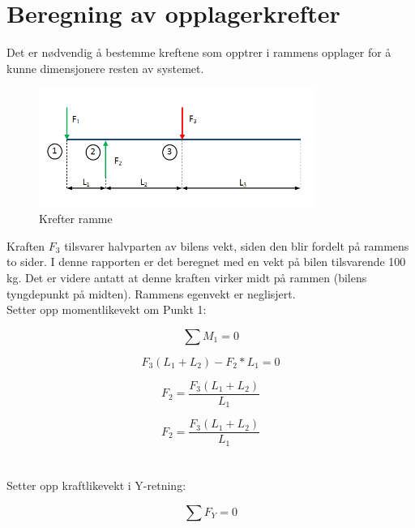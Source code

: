 \section{Beregning av opplagerkrefter}
Det er nødvendig å bestemme kreftene som opptrer i rammens opplager for å kunne dimensjonere resten av systemet.


\begin{figure}[htb]
\begin{center}
\leavevmode
\includegraphics[width=0.8\textwidth]{images/Bilden_1}
\end{center}
\caption{Krefter ramme}
\label{fig:Krefter}
\end{figure}


Kraften $F_3$ tilsvarer halvparten av bilens vekt, siden den blir fordelt på rammens to sider. I denne rapporten er det beregnet med en vekt på bilen tilsvarende 100 kg. Det er videre antatt at denne kraften virker midt på rammen (bilens tyngdepunkt på midten). Rammens egenvekt er neglisjert. \\



Setter opp momentlikevekt om Punkt 1:

\begin{equation}
\sum{M_1}=0
\end{equation}

\begin{equation}
F_3(L_1+L_2)-F_2*L_1=0
\end{equation}
 
\begin{equation}
F_2=\frac{F_3(L_1+L_2)}{L_1}
\end{equation}

\begin{equation}
F_2=\frac{F_3(L_1+L_2)}{L_1}
\end{equation}\\\\

Setter opp kraftlikevekt i Y-retning:


\begin{equation}
\sum{F_Y}=0
\end{equation}

